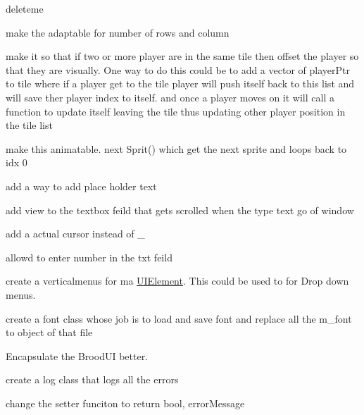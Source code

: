 \begin{DoxyRefList}
\label{todo__todo000011}%
%
deleteme  
\item[Member \mbox{\hyperlink{class_brood_1_1_sprite_handler_a5ac5756649b5396c2e9a7bfd9bff49f8}{Brood\+::Sprite\+Handler\+::Set\+Sprite\+From\+Texture}} (unsigned a\+\_\+num)]\label{todo__todo000013}%
%
make the adaptable for number of rows and column 
\item[Class \mbox{\hyperlink{class_player}{Player}} ]\label{todo__todo000012}%
%
make it so that if two or more player are in the same tile then offset the player so that they are visually. One way to do this could be to add a vector of player\+Ptr to tile where if a player get to the tile player will push itself back to this list and will save ther player index to itself. and once a player moves on it will call a function to update itself leaving the tile thus updating other player position in the tile list 
\item[Class \mbox{\hyperlink{class_sprite_handler}{Sprite\+Handler}} ]\label{todo__todo000014}%
%
make this animatable. next Sprit() which get the next sprite and loops back to idx 0  
\item[Class \mbox{\hyperlink{class_text_box}{Text\+Box}} ]\label{todo__todo000015}%
%
add a way to add place holder text 



add view to the textbox feild that gets scrolled when the type text go of window 



add a actual cursor instead of \+\_\+ 
\item[Class \mbox{\hyperlink{class_tile_editor}{Tile\+Editor}} ]\label{todo__todo000016}%
%
allowd to enter number in the txt feild 
\item[Class \mbox{\hyperlink{class_u_i_element}{UIElement}} ]\label{todo__todo000018}%
%
create a verticalmenus for ma \mbox{\hyperlink{class_u_i_element}{UIElement}}. This could be used to for Drop down menus. 



create a font class whose job is to load and save font and replace all the m\+\_\+font to object of that file 



Encapsulate the Brood\+UI better. 



create a log class that logs all the errors 



change the setter funciton to return bool, error\+Message
\end{DoxyRefList}